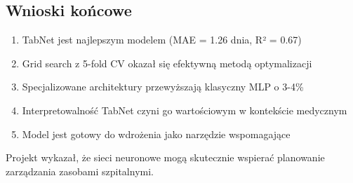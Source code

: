 \subsection{Wnioski końcowe}

\begin{enumerate}
    \item TabNet jest najlepszym modelem (MAE = 1.26 dnia, R² = 0.67)
    \item Grid search z 5-fold CV okazał się efektywną metodą optymalizacji
    \item Specjalizowane architektury przewyższają klasyczny MLP o 3-4\%
    \item Interpretowalność TabNet czyni go wartościowym w kontekście medycznym
    \item Model jest gotowy do wdrożenia jako narzędzie wspomagające
\end{enumerate}

Projekt wykazał, że sieci neuronowe mogą skutecznie wspierać planowanie zarządzania zasobami szpitalnymi.


